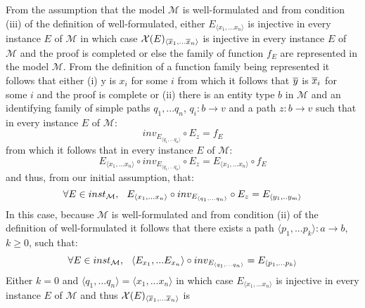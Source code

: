 \documentclass[10pt,a4paper]{article}
\newcommand{\genericmodel}{\mathcal{M}}
\newcommand{\logtophys}{\mathcal{X}}
\begin{document}
\noindent
From the assumption that the model $\genericmodel$ is well-formulated and from condition (iii) 
of the definition of well-formulated, either 
$E_{\langle x_1,...x_n \rangle}$ is injective in every instance $E$ of $\genericmodel$ in which case 
$\logtophys(E)_{\langle \phys{x}_1,...\phys{x}_n \rangle}$ is injective in every instance $E$ of $\genericmodel$ and the proof is completed or else
the family of function $f_E$ are represented in the model $\genericmodel$. From the definition of a function family being represented it follows that
either (i)  y is $x_i$ for some $i$ 
from which it follows that $\overline{y}$ is $\overline{x}_i$ for some $i$ and the proof is complete or (ii) there
is an entity type $b$ in $\genericmodel$ and an identifying family of simple paths $q_1,...q_n$, 
$q_i: b \rightarrow v$ and a 
path $z: b \rightarrow v$ such that in every instance $E$ of $\genericmodel$:
\newcommand{\ineveryinstance}{\forall E \in inst_\genericmodel ,  \hspace{0.25cm} }
\begin{equation*}
inv_{E_{\langle q_1,...q_n \rangle}} \circ E_{z} = f_E
\end{equation*}
\noindent from which it follows that in every instance $E$ of $\genericmodel$:  
\begin{equation*}
E_{\langle x_1,...x_n \rangle}\circ inv_{E_{\langle q_1,...q_n \rangle}} \circ E_{z}  = E_{\langle x_1,...x_n \rangle} \circ f_E 
\end{equation*}
\noindent and thus, from our initial assumption, that:
\begin{equation}
\label{representationByIdentifyingRelationships}
\ineveryinstance E_{\langle x_1,...x_n \rangle}\circ inv_{E_{\langle q_1,...q_n \rangle}} \circ E_{z} = E_{\langle y_1,..y_m \rangle} 
\end{equation}
\noindent In this case, because $\genericmodel$ is well-formulated and from condition (ii) of the definition of well-formulated it follows that there exists
a path $\langle p_1,...p_k \rangle:a \rightarrow b$, $k \geq 0$, such that:
\begin{equation}
\label{simpleRepresentationOfFirstPart}
\ineveryinstance \langle E_{x_1},...E_{x_n} \rangle \circ inv_{E_{\langle q_1,...q_n \rangle}} = E_{\langle p_1,...p_k \rangle}
\end{equation}
\noindent Either $k=0$ and $\langle q_1,...q_n \rangle = \langle x_1,...x_n \rangle$ in which case $E_{\langle x_1,...x_n \rangle}$ is
injective in every instance $E$ of $\genericmodel$ and thus $\logtophys(E)_{\langle \phys{x}_1,...\phys{x}_n \rangle}$ is
\end{document}
